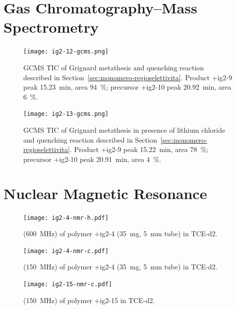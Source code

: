\clearpage
\section*{Gas Chromatography--Mass Spectrometry}

\begin{figure}%
\texttt{[image: ig2-12-gcms.png]}
\caption[GCMS of Grignard metathesis and quenching reaction.]{GCMS TIC of Grignard metathesis and quenching reaction described in Section~\ref{sec:monomero-regioselettivita}. Product \cmpd+{ig2-9} peak \SI{15.23}{\minute}, area 94~\%; precursor \cmpd+{ig2-10} peak \SI{20.92}{\minute}, area 6~\%.}
\label{fig:ig2-12-gcms}
\end{figure}%

\begin{figure}%
\texttt{[image: ig2-13-gcms.png]}
\caption[GCMS of Grignard metathesis in presence of lithium chloride and quenching reaction.]{GCMS TIC of Grignard metathesis in presence of lithium chloride and quenching reaction described in Section~\ref{sec:monomero-regioselettivita}. Product \cmpd+{ig2-9} peak \SI{15.22}{\minute}, area 78~\%; precursor \cmpd+{ig2-10} peak \SI{20.91}{\minute}, area 4~\%.}
\label{fig:ig2-13-gcms}
\end{figure}

\FloatBarrier
\clearpage

\FloatBarrier
\clearpage
\section*{Nuclear Magnetic Resonance}

\label{sec:hnmr}

\begin{figure}%
\centering
\texttt{[image: ig2-4-nmr-h.pdf]}
\caption[{\HNMR} of polymer \cmpd+{ig2-4}.]{{\HNMR} (\SI{600}{\MHz}) of polymer \cmpd+{ig2-4} (\SI{35}{\mg}, \SI{5}{\mm} tube) in \gls{TCE}-d2.}
\label{fig:ig2-4-nmr-h}
\end{figure}

\begin{figure}%
\centering
\texttt{[image: ig2-4-nmr-c.pdf]}
\caption[{\CNMR} of polymer \cmpd+{ig2-4}.]{{\CNMR} (\SI{150}{\MHz}) of polymer \cmpd+{ig2-4} (\SI{35}{\mg}, \SI{5}{\mm} tube) in \gls{TCE}-d2.}
\label{fig:ig2-4-nmr-c}
\end{figure}

\begin{figure}%
\centering
\texttt{[image: ig2-15-nmr-c.pdf]}
\caption[{\CNMR} of polymer \cmpd+{ig2-15}.]{{\CNMR} (\SI{150}{\MHz}) of polymer \cmpd+{ig2-15} in \gls{TCE}-d2.}
\label{fig:ig2-15-nmr-c}
\end{figure}

